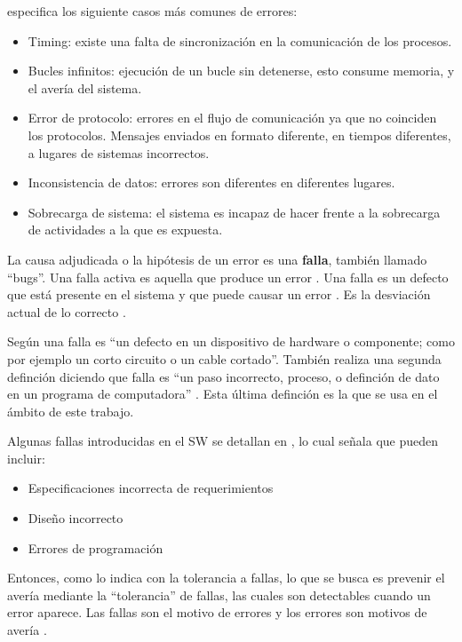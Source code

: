 \cite{Hanmer07} especifica los siguiente casos más comunes de errores:
\begin{itemize}
 \item Timing: existe una falta de sincronización en la comunicación de los procesos.
 \item Bucles infinitos: ejecución de un bucle sin detenerse, esto consume memoria, y el 
avería del sistema.
 \item Error de protocolo: errores en el flujo de comunicación ya que no coinciden los 
protocolos. Mensajes enviados en formato diferente, en tiempos diferentes, a lugares de sistemas 
incorrectos.
 \item Inconsistencia de datos: errores son diferentes en diferentes lugares.
 \item Sobrecarga de sistema: el sistema es incapaz de hacer frente a la sobrecarga de 
actividades a la que es expuesta.
\end{itemize}

La causa adjudicada o la hipótesis de un error es una \textbf{falla}, también llamado ``bugs''. Una 
falla activa es aquella que produce un error \citep{Pullum01}. Una falla es un defecto que está 
presente en el sistema y que puede causar un error \citep{Hanmer07}. Es la desviación actual de lo 
correcto \cite{Hanmer07}.

Según \cite{IEEE610.12} una falla es ``un defecto en un dispositivo de hardware o componente; como 
por ejemplo un corto circuito o un cable cortado''. También realiza una segunda definción diciendo 
que falla es ``un paso incorrecto, proceso, o definción de dato en un programa de computadora'' 
\cite{IEEE610.12}. Esta última definción es la que se usa en el ámbito de este trabajo.

Algunas fallas introducidas en el \ac{SW} se detallan en \cite{Hanmer07}, lo cual señala que 
pueden incluir:
\begin{itemize}
 \item Especificaciones incorrecta de requerimientos
 \item Diseño incorrecto
 \item Errores de programación
\end{itemize}

Entonces, como lo indica \cite{Pullum01} con la tolerancia a fallas, lo que se busca es prevenir el 
avería mediante la ``tolerancia'' de fallas, las cuales son detectables cuando un error aparece. 
Las fallas son el motivo de errores y los errores son motivos de avería \citep{FTDesign}.

